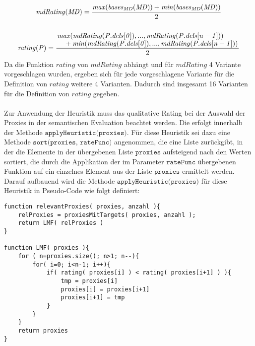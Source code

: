 \begin{gather*}
\mathit{mdRating(MD)} = \frac{\mathit{max(bases_{MD}(MD))}+\mathit{min(bases_{MD}(MD))}}{2}
\\\\
\mathit{rating(P)} = \frac{\splitfrac{ \mathit{max(mdRating(P.dels[0]),...,mdRating(P.dels[n-1]))}}{+\mathit{min(mdRating(P.dels[0]),...,mdRating(P.dels[n-1]))}}}{2}
\end{gather*}
\noindent
Da die Funktion $\mathit{rating}$ von $\mathit{mdRating}$ abhängt und für $\mathit{mdRating}$ 4 Variante vorgeschlagen wurden, ergeben sich für jede vorgeschlagene Variante für die Definition von $\mathit{rating}$ weitere 4 Varianten. Dadurch sind insgesamt 16 Varianten für die Definition von $\mathit{rating}$ gegeben.
\\\\
Zur Anwendung der Heuristik muss das qualitative Rating bei der Auswahl der Proxies in der semantischen Evaluation beachtet werden. Die erfolgt innerhalb der Methode $\texttt{applyHeuristic(proxies)}$. Für diese Heuristik sei dazu eine Methode $\texttt{sort(proxies, rateFunc)}$ angenommen, die eine Liste zurückgibt, in der die Elemente in der übergebenen Liste $\texttt{proxies}$ aufsteigend nach den Werten sortiert, die durch die Applikation der im Parameter $\texttt{rateFunc}$ übergebenen Funktion auf ein einzelnes Element aus der Liste $\texttt{proxies}$ ermittelt werden. Darauf aufbauend wird die Methode $\texttt{applyHeuristic(proxies)}$ für diese Heuristik in Pseudo-Code wie folgt definiert:

\begin{lstlisting}[style = pseudo]
function relevantProxies( proxies, anzahl ){
	relProxies = proxiesMitTargets( proxies, anzahl );
	return LMF( relProxies )
}

function LMF( proxies ){
	for	( n=proxies.size(); n>1; n--){
		for( i=0; i<n-1; i++){
			if( rating( proxies[i] ) < rating( proxies[i+1] ) ){
				tmp = proxies[i]
				proxies[i] = proxies[i+1]
				proxies[i+1] = tmp
			}
		}
	}	
	return proxies
}
\end{lstlisting}


